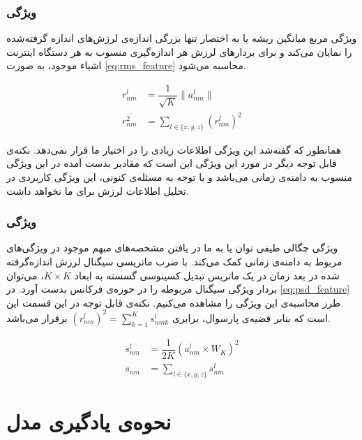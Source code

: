 \subsubsection{ویژگی }
ویژگی مربع میانگین ریشه یا به اختصار  تنها بزرگی اندازه‌ی لرزش‌های اندازه‌ گرفته‌شده را نمایان می‌کند و برای بردارهای لرزش هر اندازه‌گیری منسوب به هر دستگاه اینترنت اشیاء موجود، به صورت \cref{eq:rms_feature} محاسبه می‌شود.

\begin{equation}
\label{eq:rms_feature}
\begin{split} 
r^l_{nm} & = \dfrac{1}{\sqrt{K}}\|a^l_{nm}\|\\
r^2_{nm} &  = \sum_{l \in \{x, y, z\}} (r^l_{nm})^2
\end{split} 
\end{equation}

همانطور که گفته‌شد این ویژگی اطلاعات زیادی را در اختیار ما قرار نمی‌دهد. نکته‌ی قابل توجه دیگر در مورد این ویژگی این است که مقادیر بدست آمده در این ویژگی منسوب به دامنه‌ی زمانی می‌باشد و با توجه به مسئله‌ی کنونی، این ویژگی کاربردی در تحلیل اطلاعات لرزش برای ما نخواهد داشت.


\subsubsection{ویژگی }
ویژگی چگالی طیفی توان یا  به ما در یافتن مشخصه‌های مبهم موجود در ویژگی‌های مربوط به دامنه‌ی زمانی کمک می‌کند. با ضرب ماتریسی سیگنال لرزش اندازه‌گرفته شده در بعد زمان در یک ماتریس تبدیل کسینوسی گسسته به ابعاد $K \times K$، می‌توان بردار ویژگی سیگنال مربوطه را در حوزه‌ی فرکانس بدست آورد. در \cref{eq:psd_feature} طرز محاسبه‌ی این ویژگی را مشاهده می‌کنیم. نکته‌ی قابل توجه در این قسمت این است که بنابر قضیه‌ی پارسوال، برابری $(r^l_{nm})^2 = \sum_{k = 1}^{K}s^l_{nmk}$ برقرار می‌باشد.

\begin{equation}
\label{eq:psd_feature}
\begin{split} 
s^l_{nm} & = \dfrac{1}{2K}(a^l_{nm} \times W_K)^2\\
s_{nm} &  = \sum_{l \in \{x, y, z\}} s^l_{nm}
\end{split} 
\end{equation}

\section{نحوه‌ی یادگیری مدل}

